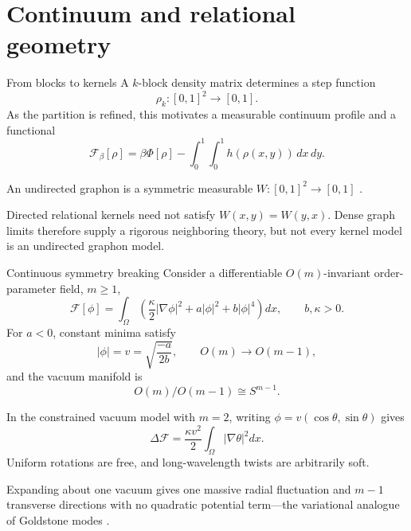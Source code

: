 \section{Continuum and relational geometry}

\begin{frame}{From blocks to kernels}
  A $k$-block density matrix determines a step function
  \[
    \rho_k:[0,1]^2\to[0,1].
  \]
  As the partition is refined, this motivates a measurable continuum profile
  and a functional
  \[
    \mathcal F_\beta[\rho]
      =\beta\Phi[\rho]
       -\int_0^1\!\int_0^1 h(\rho(x,y))\,dx\,dy.
  \]

  \begin{definition}
    An undirected graphon is a symmetric measurable
    $W:[0,1]^2\to[0,1]$ \cite{lovaszszegedy2006}.
  \end{definition}

  Directed relational kernels need not satisfy $W(x,y)=W(y,x)$. Dense graph
  limits therefore supply a rigorous neighboring theory, but not every kernel
  model is an undirected graphon model.
\end{frame}

\begin{frame}{Continuous symmetry breaking}
  \small
  Consider a differentiable $O(m)$-invariant order-parameter field, $m\geq1$,
  \[
    \mathcal F[\phi]
      =\int_\Omega
      \left(\frac\kappa2|\nabla\phi|^2+a|\phi|^2+b|\phi|^4\right)dx,
      \qquad b,\kappa>0.
  \]
  For $a<0$, constant minima satisfy
  \[
    |\phi|=v=\sqrt{\frac{-a}{2b}},
    \qquad
    O(m)\longrightarrow O(m-1),
  \]
  and the vacuum manifold is
  \[
    O(m)/O(m-1)\cong S^{m-1}.
  \]

  In the constrained vacuum model with $m=2$, writing
  $\phi=v(\cos\theta,\sin\theta)$ gives
  \[
    \Delta\mathcal F=\frac{\kappa v^2}{2}\int_\Omega|\nabla\theta|^2dx.
  \]
  Uniform rotations are free, and long-wavelength twists are arbitrarily soft.

  Expanding about one vacuum gives one massive radial fluctuation and $m-1$
  transverse directions with no quadratic potential term—the variational
  analogue of Goldstone modes \cite{goldstone1962}.
\end{frame}

